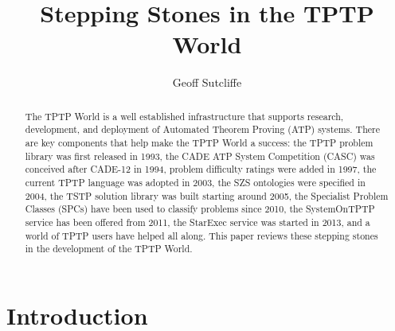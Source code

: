 \documentclass{easychair}
\title{Stepping Stones in the TPTP World}
\author{
  Geoff Sutcliffe
}
\institute{
  University of Miami,
  Miami, USA\\
  \email{geoff@cs.miami.edu}\\
}
\begin{document}
\maketitle

\begin{abstract}
The TPTP World is a well established infrastructure that supports research, development, and 
deployment of Automated Theorem Proving (ATP) systems.
There are key components that help make the TPTP World a success: 
the TPTP problem library was first released in 1993,
the CADE ATP System Competition (CASC) was conceived after CADE-12 in 1994, 
problem difficulty ratings were added in 1997, 
the current TPTP language was adopted in 2003, 
the SZS ontologies were specified in 2004, 
the TSTP solution library was built starting around 2005, 
the Specialist Problem Classes (SPCs) have been used to classify problems since 2010, 
the SystemOnTPTP service has been offered from 2011, 
the StarExec service was started in 2013,
and 
a world of TPTP users have helped all along.
This paper reviews these stepping stones in the development of the TPTP World.
\end{abstract}
\section{Introduction}
\label{Introduction}
\end{document}
